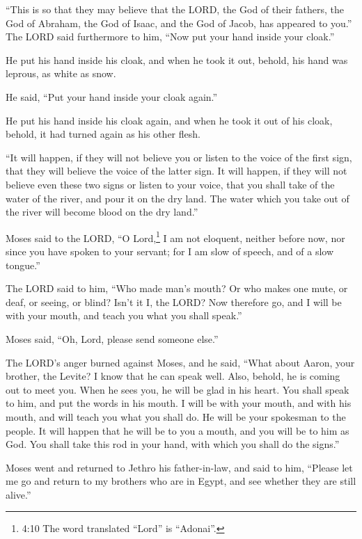 \myverse{}“This is so that they may believe that the LORD, the God of their
fathers, the God of Abraham, the God of Isaac, and the God of Jacob, has appeared to you.” \myverse{}The LORD said furthermore to him, “Now put your hand inside your cloak.”

He put his hand inside his cloak, and when he took it out, behold, his hand was leprous, as white as snow.


\myverse{}He said, “Put your hand inside your cloak again.”

He put his hand inside his cloak again, and when he took it out of his cloak, behold, it
had turned again as his other flesh.


\myverse{}“It will happen, if they will not believe you or listen to the voice of the first sign, that they will believe the voice of the latter sign. \myverse{}It will happen, if they will not believe even these two signs or listen to your voice, that you shall take of the water of the river, and pour it on the dry land. The water which you take out of the river will become blood on the dry land.”


\myverse{}Moses said to the LORD, “O Lord,\footnote{4:10 The word translated “Lord” is “Adonai”.} I am not eloquent, neither before now, nor since
you have spoken to your servant; for I am slow of speech, and of a slow tongue.”


\myverse{}The LORD said to him, “Who made man’s mouth? Or who makes one mute, or deaf, or seeing, or blind? Isn’t it I, the LORD? \myverse{}Now therefore go, and I will be with your mouth, and teach you what you shall speak.”


\myverse{}Moses said, “Oh, Lord, please send someone else.”


\myverse{}The LORD’s anger burned against Moses, and he said, “What about Aaron, your brother, the Levite? I know that he can speak well. Also, behold, he is coming out to meet you. When he sees you, he will be glad in his heart. \myverse{}You shall speak to him, and put the words in his mouth. I will be with your mouth, and with his mouth, and will teach you what you shall do. \myverse{}He will be your spokesman to the people. It will happen that he will be to you a mouth, and you will be to him as God. \myverse{}You shall take this rod in your hand, with which you shall do the signs.”


\myverse{}Moses went and returned to Jethro his father-in-law, and said to him, “Please let me go and return to my brothers who are in Egypt, and see whether they are still alive.”

